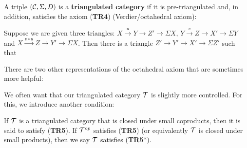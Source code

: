 \documentclass[12pt]{article}
\begin{document}
\begin{defn}
	A triple $(\mathcal{C},\Sigma, D)$ is a \textbf{triangulated category} if it is pre-triangulated and, in addition,
	satisfies the axiom (\textbf{TR4}) (Verdier/octahedral axiom):

	Suppose we are given three triangles: $X\xrightarrow{u}Y\to Z'\to\Sigma X$, $Y\xrightarrow{v}Z\to X'\to\Sigma Y$
	and $X\xrightarrow{v\circ u} Z\to Y'\to\Sigma X$. Then there is a triangle $Z'\to Y'\to X'\to\Sigma Z'$ such that
	\begin{center}
	\end{center}
\end{defn}
\begin{rmk}
There are two other representations of the octahedral axiom that are sometimes more helpful:
\begin{center}
\end{center}

\begin{center}
\end{center}
\end{rmk}

We often want that our triangulated category $\mathcal{T}$ is slightly more controlled. For this, we introduce another 
condition:
\begin{defn}
  If $\mathcal{T}$ is a triangulated category that is closed under small coproducts, then it is said to satisfy (\textbf{TR5}). If $\mathcal{T}^{op}$ satisfies (\textbf{TR5}) (or equivalently $\mathcal{T}$ is closed under small products), then we say $\mathcal{T}$ satisfies (\textbf{TR5}*).
\end{defn}
\end{document}
